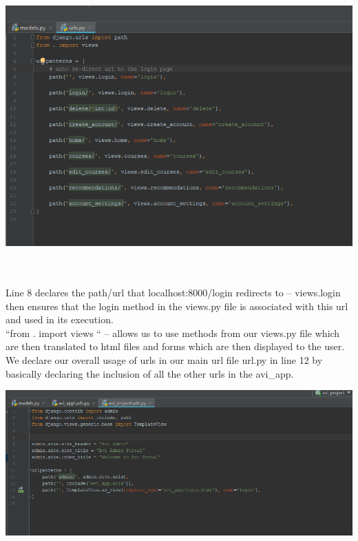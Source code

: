 \documentclass[10pt]{article}
\begin{document}
\begin{center}
\includegraphics[width=1.1\textwidth]{p4.png}
\end{center} \\ \\

Line 8 declares the path/url that localhost:8000/login redirects to – views.login then ensures that the login method in the views.py file is associated with this url and used in its execution. \\

“from . import views “ – allows us to use methods from our views.py file which are then translated to html files and forms which are then displayed to the user. \\

We declare our overall usage of urls in our main url file url.py in line 12 by basically declaring the inclusion of all the other urls in the avi\_app.

\begin{center}
\includegraphics[width=1.1\textwidth]{p5.png}
\end{center} \\ \\
\end{document}

